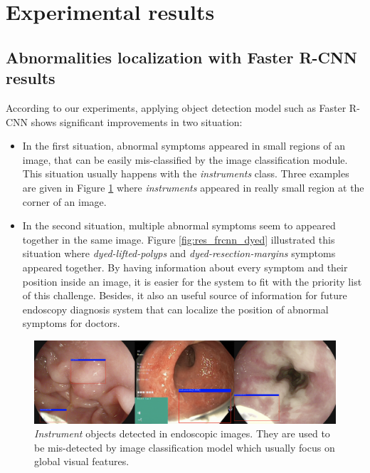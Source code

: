 \section{Experimental results}
\subsection{Abnormalities localization with Faster R-CNN results}
According to our experiments, applying object detection model such as Faster R-CNN shows significant improvements in two situation:
\begin{itemize}
    \item In the first situation, abnormal symptoms appeared in small regions of an image, that can be easily mis-classified by the image classification module. This situation usually happens with the \textit{instruments} class. Three examples are given in Figure \ref{fig:res_frcnn_instr} where \textit{instruments} appeared in really small region at the corner of an image.
    \item In the second situation, multiple abnormal symptoms seem to appeared together in the same image. Figure \ref{fig:res_frcnn_dyed} illustrated this situation where \textit{dyed-lifted-polyps} and \textit{dyed-resection-margins} symptoms appeared together. By having information about every symptom and their position inside an image, it is easier for the system to fit with the priority list of this challenge. Besides, it also an useful source of information for future endoscopy diagnosis system that can localize the position of abnormal symptoms for doctors.  
\end{itemize} 

\begin{figure}[thb]
\begin{center}
\includegraphics[width=\textwidth]{endoscopy_resources/res_frcnn_instr.png}
\end{center}
   \caption{\textit{Instrument} objects detected in endoscopic images. They are used to be mis-detected by image classification model which usually focus on global visual features.}
\label{fig:res_frcnn_instr}
\end{figure}

